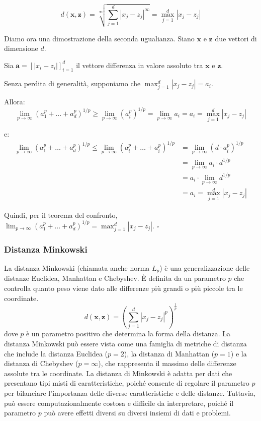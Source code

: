     \[
    d(\mathbf{x}, \mathbf{z}) = \sqrt[\infty]{\sum_{j=1}^d |x_j - z_j|^{\infty}} = \max_{j=1}^d |x_j - z_j|
    \]

    Diamo ora una dimostrazione della seconda ugualianza. Siano $\mathbf x$ e $\mathbf z$ due vettori di dimensione $d$.
    
    Sia $\mathbf a = [|x_i - z_i|]^{d}_{i=1}$ il vettore differenza in valore assoluto tra $\mathbf x$ e $\mathbf z$.
    
    Senza perdita di generalità, supponiamo che $\max_{j=1}^d |x_j - z_j| = a_i$.
    
    Allora:
    \[
    \lim_{p \to \infty} (a^p_1 + \ldots + a^p_d)^{1/p} \geq \lim_{p \to \infty} (a^p_i)^{1/p} = \lim_{p \to \infty} a_i = a_i = \max_{j=1}^d |x_j - z_j|
    \]
    
    e:
    \begin{align*}
    \lim_{p \to \infty} (a^p_1 + \ldots + a^p_d)^{1/p} \leq \lim_{p \to \infty} (a^p_i + \ldots + a^p_i)^{1/p} &= \lim_{p \to \infty} (d \cdot a^p_i)^{1/p} \\
    &= \lim_{p \to \infty} a_i \cdot d^{1/p} \\
    &= a_i \cdot \lim_{p \to \infty} d^{1/p} \\
    &= a_i = \max_{j=1}^d |x_j - z_j|
    \end{align*}

    Quindi, per il teorema del confronto, $\lim_{p \to \infty} (a^p_1 + \ldots + a^p_d)^{1/p} = \max_{j=1}^d |x_j - z_j|$. $\square$

\subsubsection{Distanza Minkowski} La distanza Minkowski (chiamata anche norma $L_p$) è
    una generalizzazione delle distanze Euclidea, Manhattan e Chebyshev. 
    È definita da un parametro $p$ che controlla quanto peso viene dato alle differenze più 
    grandi o più piccole tra le coordinate.
    \[
    d(\mathbf{x}, \mathbf{z}) = \left( \sum_{j=1}^d |x_j - z_j|^p \right)^{\frac{1}{p}}
    \]
    dove \( p \) è un parametro positivo che determina la forma della distanza. La distanza 
    Minkowski può essere vista come una famiglia di metriche di distanza che include la 
    distanza Euclidea ($p = 2$), la distanza di Manhattan ($p = 1$) e la distanza di 
    Chebyshev ($p = \infty$), che rappresenta il massimo delle differenze assolute 
    tra le coordinate. La distanza di Minkowski è adatta per dati che presentano tipi misti 
    di caratteristiche, poiché consente di regolare il parametro $p$ per bilanciare 
    l'importanza delle diverse caratteristiche e delle distanze. Tuttavia, può essere 
    computazionalmente costosa e difficile da interpretare, poiché il parametro $p$ può 
    avere effetti diversi su diversi insiemi di dati e problemi.

